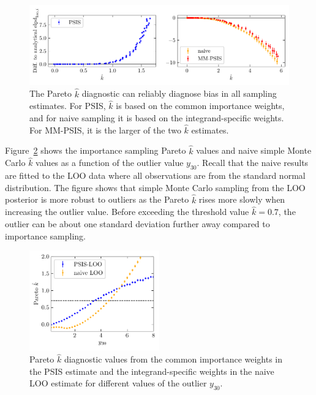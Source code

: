 \documentclass[12pt]{article}
\begin{document}
\begin{figure}[tbp]
\centering
\includegraphics[width=\textwidth]{figs/normaldata_kplots.pdf}
%
\caption{The Pareto $\hat{k}$ diagnostic can reliably diagnose
bias in all sampling estimates. For PSIS, $\hat{k}$ is based on the common importance weights, and
for naive sampling it is based on the integrand-specific weights.
For MM-PSIS, it is the larger of the two $\hat{k}$ estimates.} \label{fig:normaldata_ks}
%
%
\end{figure}








Figure~\ref{fig:normaldata_x_v_k} shows the importance sampling Pareto $\hat{k}$ values
and naive simple Monte Carlo $\hat{k}$ values as a function of the outlier value $y_{30}$.
Recall that the naive results are fitted to the LOO data where
all observations are from the standard normal distribution.
The figure shows that simple Monte Carlo sampling from the LOO posterior
is more robust to outliers as the
Pareto $\hat{k}$ rises more slowly when increasing the outlier value.
Before exceeding the threshold value $\hat{k} = 0.7$, the outlier can
be about one standard deviation further away compared to importance sampling.
%
%
%
%
%


\begin{figure}[h]
\centering
\includegraphics[width=0.5\textwidth]{figs/normaldata_x_v_k.pdf}
%
\caption{Pareto $\hat{k}$ diagnostic values from the common importance weights in
the PSIS estimate and the integrand-specific weights in the naive LOO estimate
for different values of the outlier $y_{30}$.} \label{fig:normaldata_x_v_k}
\end{figure}
\end{document}
